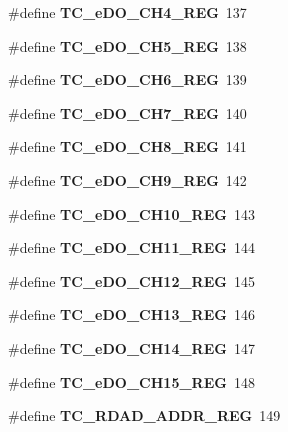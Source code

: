 \begin{DoxyCompactItemize}
\item 
\mbox{\label{_t_a_r_g_e_t_c___register_map_8h_ac0d14d7a16998f3b6309c6ebce72123f}} 
\#define {\bfseries T\+C\+\_\+e\+D\+O\+\_\+\+C\+H4\+\_\+\+R\+EG}~137
\item 
\mbox{\label{_t_a_r_g_e_t_c___register_map_8h_a1c0a273ae0bec71a899cf55556053c29}} 
\#define {\bfseries T\+C\+\_\+e\+D\+O\+\_\+\+C\+H5\+\_\+\+R\+EG}~138
\item 
\mbox{\label{_t_a_r_g_e_t_c___register_map_8h_ae7344b1916ed6522f65a77de064f993e}} 
\#define {\bfseries T\+C\+\_\+e\+D\+O\+\_\+\+C\+H6\+\_\+\+R\+EG}~139
\item 
\mbox{\label{_t_a_r_g_e_t_c___register_map_8h_a3278d32f7947ce4978e23965d943f202}} 
\#define {\bfseries T\+C\+\_\+e\+D\+O\+\_\+\+C\+H7\+\_\+\+R\+EG}~140
\item 
\mbox{\label{_t_a_r_g_e_t_c___register_map_8h_aa241e8643d2b2c2d70ab01e0d0b76c45}} 
\#define {\bfseries T\+C\+\_\+e\+D\+O\+\_\+\+C\+H8\+\_\+\+R\+EG}~141
\item 
\mbox{\label{_t_a_r_g_e_t_c___register_map_8h_a39c687a6f9ec0d2f8ccb3b2faecfde3c}} 
\#define {\bfseries T\+C\+\_\+e\+D\+O\+\_\+\+C\+H9\+\_\+\+R\+EG}~142
\item 
\mbox{\label{_t_a_r_g_e_t_c___register_map_8h_a955fb8aa57f521bf1ecd73a46f436451}} 
\#define {\bfseries T\+C\+\_\+e\+D\+O\+\_\+\+C\+H10\+\_\+\+R\+EG}~143
\item 
\mbox{\label{_t_a_r_g_e_t_c___register_map_8h_ad21b7cae9364377be74c4f8955b8c591}} 
\#define {\bfseries T\+C\+\_\+e\+D\+O\+\_\+\+C\+H11\+\_\+\+R\+EG}~144
\item 
\mbox{\label{_t_a_r_g_e_t_c___register_map_8h_a89d3c191e09b5a2fd9dba84d131bbcc7}} 
\#define {\bfseries T\+C\+\_\+e\+D\+O\+\_\+\+C\+H12\+\_\+\+R\+EG}~145
\item 
\mbox{\label{_t_a_r_g_e_t_c___register_map_8h_a0e1c8296e9f2306d1977b8d568c73dc3}} 
\#define {\bfseries T\+C\+\_\+e\+D\+O\+\_\+\+C\+H13\+\_\+\+R\+EG}~146
\item 
\mbox{\label{_t_a_r_g_e_t_c___register_map_8h_a29b485c0731976566c3af66844eb7462}} 
\#define {\bfseries T\+C\+\_\+e\+D\+O\+\_\+\+C\+H14\+\_\+\+R\+EG}~147
\item 
\mbox{\label{_t_a_r_g_e_t_c___register_map_8h_a36ebe25b50f49943be34477eef8c396a}} 
\#define {\bfseries T\+C\+\_\+e\+D\+O\+\_\+\+C\+H15\+\_\+\+R\+EG}~148
\item 
\mbox{\label{_t_a_r_g_e_t_c___register_map_8h_aec12d6e3edae3968001c1c8f646ad6f6}} 
\#define {\bfseries T\+C\+\_\+\+R\+D\+A\+D\+\_\+\+A\+D\+D\+R\+\_\+\+R\+EG}~149

\end{DoxyCompactItemize}
